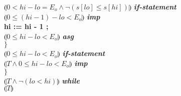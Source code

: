 \documentclass[12pt]{article}
\begin{document}
\hspace*{20mm}$\limg 0 < hi - lo = E_o \land \neg(s[lo] \leq s[hi]) \rimg$ \textit{\textbf{if-statement}}\\
\hspace*{20mm}$\limg 0 \leq (hi - 1) - lo < E_o \rimg$ \textit{\textbf{imp}}\\
\hspace*{20mm}\textbf{hi := hi - 1 ;} \\
\hspace*{20mm}$\limg 0 \leq hi - lo < E_o \rimg$ \textit{\textbf{asg}}\\
\hspace*{10mm}\textbf{$\}$} \\
\hspace*{10mm}$\limg 0 \leq hi - lo < E_o \rimg$ \textit{\textbf{if-statement}}\\
\hspace*{10mm}$\limg T \land 0 \leq hi - lo < E_o \rimg$ \textit{\textbf{imp}}\\
\textbf{$\}$} \\
$\limg T \land \neg (lo < hi)\rimg$ \textit{\textbf{while}}\\ 
$\limg T \rimg$
\newpage
\end{document}
